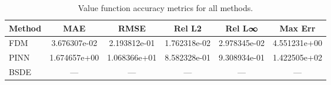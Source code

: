 \begin{table}[ht]
\centering
\caption{Value function accuracy metrics for all methods.}
\label{tab:value_accuracy}
\begin{tabular}{lccccc}
\toprule
Method & MAE & RMSE & Rel L2 & Rel L∞ & Max Err \\
\midrule
FDM & 3.676307e-02 & 2.193812e-01 & 1.762318e-02 & 2.978345e-02 & 4.551231e+00 \\
PINN & 1.674657e+00 & 1.068366e+01 & 8.582328e-01 & 9.308934e-01 & 1.422505e+02 \\
BSDE & — & — & — & — & — \\
\bottomrule
\end{tabular}
\end{table}